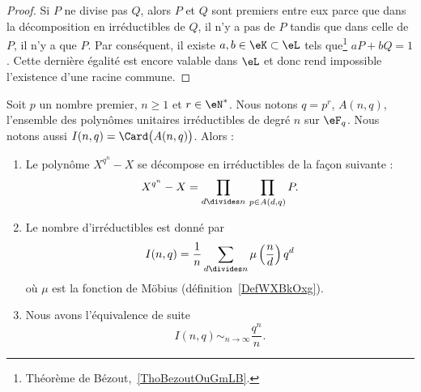 \begin{proof}
    Si \( P\) ne divise pas \( Q\), alors \( P\) et \( Q\) sont premiers entre eux parce que dans la décomposition en irréductibles de \( Q\), il n'y a pas de \( P\) tandis que dans celle de \( P\), il n'y a que \( P\). Par conséquent, il existe \( a,b\in \eK\subset\eL\) tels que\footnote{Théorème de Bézout,~\ref{ThoBezoutOuGmLB}.} \( aP+bQ=1\). Cette dernière égalité est encore valable dans \( \eL\) et donc rend impossible l'existence d'une racine commune.
\end{proof}

\begin{proposition} \label{PropVFNOvzZ}
    Soit \( p\) un nombre premier, \( n\geq 1\) et \( r\in \eN^*\). Nous notons \( q=p^r\), \( A(n,q)\), l'ensemble des polynômes unitaires irréductibles de degré \( n\) sur \( \eF_q\). Nous notons aussi \( I(n,q)=\Card\big( A(n,q) \big)\). Alors :
    \begin{enumerate}
        \item
            Le polynôme \( X^{q^n}-X\) se décompose en irréductibles de la façon suivante :
            \begin{equation}
                X^{q^n}-X=\prod_{d\divides n}\,\prod_{p\in A(d,q)}P.
            \end{equation}
        \item
            Le nombre d'irréductibles est donné par
            \begin{equation}
                I(n,q)=\frac{1}{ n }\sum_{d\divides n}\mu\left( \frac{ n }{ d } \right)q^d
            \end{equation}
            où \( \mu\) est la fonction de Möbius (définition~\ref{DefWXBkOxg}).
        \item
            Nous avons l'équivalence de suite
            \begin{equation}
                I(n,q)\sim_{n\to\infty}\frac{ q^n }{ n }.
            \end{equation}
    \end{enumerate}
\end{proposition}

